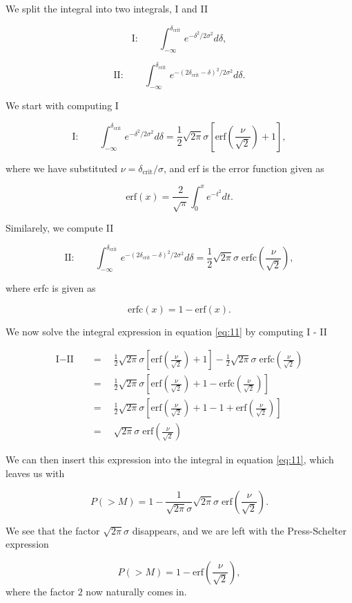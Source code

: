 \documentclass[a4paper,10pt]{article}
\begin{document}
\noindent We split the integral into two integrals, I and II

\[
     \text{I}:\qquad  \int_{-\infty}^{\delta_\text{crit}} e^{- \delta^2 /2 \sigma^2} d\delta,
\]

\[
    \text{II}:\qquad  \int_{-\infty}^{\delta_\text{crit}} e^{- (2\delta_\text{crit} - \delta)^2/2 \sigma^2} d\delta.
\]

\noindent We start with computing I

\[
    \text{I}:\qquad  \int_{-\infty}^{\delta_\text{crit}} e^{- \delta^2 /2 \sigma^2} d\delta = \frac{1}{2} \sqrt{2 \pi} \sigma\left[ \text{erf}  \left( \frac{\nu}{\sqrt{2}}\right) + 1 \right],
\]

\noindent where we have substituted $\nu = \delta_\text{crit}/ \sigma$, and erf is the error function given as 

\[
    \text{erf}(x) = \frac{2}{\sqrt{\pi}} \int_0^x e^{-t^2} dt.
\]

\noindent Similarely, we compute II

\[
    \text{II}:\qquad  \int_{-\infty}^{\delta_\text{crit}} e^{- (2\delta_\text{crit} - \delta)^2/2 \sigma^2} d\delta = \frac{1}{2} \sqrt{2 \pi} \sigma \; \text{erfc} \left( \frac{\nu}{\sqrt{2}}\right),
\]

\noindent where erfc is given as

\[
    \text{erfc}(x) = 1 - \text{erf}(x).
\]

\noindent We now solve the integral expression in equation \eqref{eq:11} by computing I - II

\begin{align*}
\text{I} - \text{II} \quad & = \quad   \frac{1}{2} \sqrt{2 \pi} \sigma\left[ \text{erf}  \left( \frac{\nu}{\sqrt{2}}\right) + 1 \right] - \frac{1}{2} \sqrt{2 \pi} \sigma \; \text{erfc} \left( \frac{\nu}{\sqrt{2}}\right)
\\
& = \quad \frac{1}{2} \sqrt{2\pi} \sigma \left[\text{erf}  \left( \frac{\nu}{\sqrt{2}}\right) + 1 - \text{erfc} \left( \frac{\nu}{\sqrt{2}}\right) \right]
\\
& = \quad \frac{1}{2} \sqrt{2\pi} \sigma \left[\text{erf}  \left( \frac{\nu}{\sqrt{2}}\right) + 1 - 1 + \text{erf} \left( \frac{\nu}{\sqrt{2}}\right) \right]
\\
& = \quad \sqrt{2\pi} \sigma \; \text{erf}  \left( \frac{\nu}{\sqrt{2}}\right)
\end{align*}

\noindent We can then insert this expression into the integral in equation \eqref{eq:11}, which leaves us with

\[
    P(> M) = 1 - \frac{1}{\sqrt{2 \pi} \sigma}\sqrt{2\pi} \sigma \; \text{erf}  \left( \frac{\nu}{\sqrt{2}}\right).
\]

\noindent We see that the factor $\sqrt{2\pi}\sigma$ disappears, and we are left with the Press-Schelter expression

\begin{equation}
     P(> M) = 1 - \text{erf}  \left( \frac{\nu}{\sqrt{2}}\right),
\end{equation}
where the factor $2$ now naturally comes in.
\end{document}
